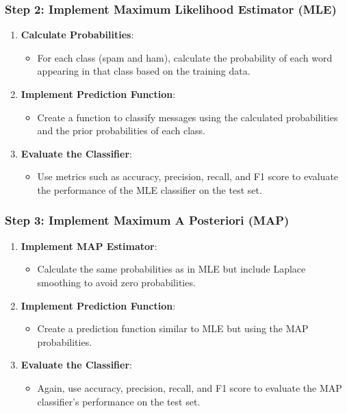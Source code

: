 \documentclass{article}
\begin{document}
\subsubsection*{Step 2: Implement Maximum Likelihood Estimator (MLE)}
\begin{enumerate}
    \item \textbf{Calculate Probabilities}:
    \begin{itemize}
        \item For each class (spam and ham), calculate the probability of each word appearing in that class based on the training data.
    \end{itemize}
    
    \item \textbf{Implement Prediction Function}:
    \begin{itemize}
        \item Create a function to classify messages using the calculated probabilities and the prior probabilities of each class.
    \end{itemize}
    
    \item \textbf{Evaluate the Classifier}:
    \begin{itemize}
        \item Use metrics such as accuracy, precision, recall, and F1 score to evaluate the performance of the MLE classifier on the test set.
    \end{itemize}
\end{enumerate}

\subsubsection*{Step 3: Implement Maximum A Posteriori (MAP)}
\begin{enumerate}
    \item \textbf{Implement MAP Estimator}:
    \begin{itemize}
        \item Calculate the same probabilities as in MLE but include Laplace smoothing to avoid zero probabilities.
    \end{itemize}
    
    \item \textbf{Implement Prediction Function}:
    \begin{itemize}
        \item Create a prediction function similar to MLE but using the MAP probabilities.
    \end{itemize}
    
    \item \textbf{Evaluate the Classifier}:
    \begin{itemize}
        \item Again, use accuracy, precision, recall, and F1 score to evaluate the MAP classifier's performance on the test set.
    \end{itemize}
\end{enumerate}
\end{document}
